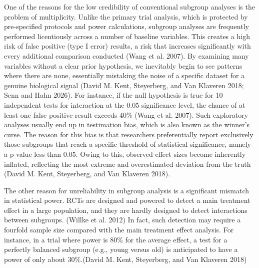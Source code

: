 \documentclass{article}
\begin{document}
One of the reasons for the low credibility of conventional subgroup
analyses is the problem of multiplicity. Unlike the primary trial
analysis, which is protected by pre-specified protocols and power
calculations, subgroup analyses are frequently performed licentiously
across a number of baseline variables. This creates a high risk of false
positive (type I error) results, a risk that increases significantly
with every additional comparison conducted (Wang et al. 2007). By
examining many variables without a clear prior hypothesis, we inevitably
begin to see patterns where there are none, essentially mistaking the
noise of a specific dataset for a genuine biological signal (David M.
Kent, Steyerberg, and Van Klaveren 2018; Senn and Hahn 2026). For
instance, if the null hypothesis is true for 10 independent tests for
interaction at the 0.05 significance level, the chance of at least one
false positive result exceeds 40\% (Wang et al. 2007). Such exploratory
analyses usually end up in testimation bias, which is also known as the
winner's curse. The reason for this bias is that researchers
preferentially report exclusively those subgroups that reach a specific
threshold of statistical significance, namely a p-value less than 0.05.
Owing to this, observed effect sizes become inherently inflated,
reflecting the most extreme and overestimated deviation from the truth
(David M. Kent, Steyerberg, and Van Klaveren 2018).

The other reason for unreliability in subgroup analysis is a significant
mismatch in statistical power. RCTs are designed and powered to detect a
main treatment effect in a large population, and they are hardly
designed to detect interactions between subgroups. (Willke et al. 2012)
In fact, such detection may require a fourfold sample size compared with
the main treatment effect analysis. For instance, in a trial where power
is 80\% for the average effect, a test for a perfectly balanced subgroup
(e.g., young versus old) is anticipated to have a power of only about
30\%.(David M. Kent, Steyerberg, and Van Klaveren 2018)
\end{document}
